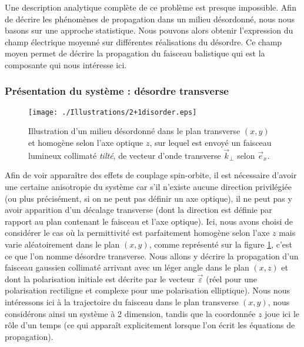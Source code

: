 \documentclass[a4paper,11pt]{article} %
\begin{document}
	Une description analytique complète de ce problème est presque impossible. Afin de décrire les phénomènes de propagation dans un milieu désordonné, nous nous basons sur une approche statistique. Nous pouvons alors obtenir l'expression du champ électrique moyenné sur différentes réalisations du désordre. Ce champ moyen permet de décrire la propagation du faisceau balistique qui est la composante qui nous intéresse ici.
	
	
	\subsubsection{Présentation du système : désordre transverse}
	
	\begin{figure}[h]
		\centering
		\begin{minipage}[c]{0.85\linewidth}
			\centering
			\texttt{[image: ./Illustrations/2+1disorder.eps]}
			\caption{Illustration d'un milieu désordonné dans le plan transverse $ (x,y) $ et homogène selon l'axe optique $ z $, sur lequel est envoyé un faisceau lumineux collimaté \textit{tilté}, de vecteur d'onde transverse $ \vec{k}_\perp $ selon $ \vec{e}_x $.}
			\label{fig:systeme_desordre_transverse}
		\end{minipage}
	\end{figure}

	Afin de voir apparaître des effets de couplage spin-orbite, il est nécessaire d'avoir une certaine anisotropie du système car s'il n'existe aucune direction privilégiée (ou plus précisément, si on ne peut pas définir un axe optique), il ne peut pas y avoir apparition d'un décalage transverse (dont la direction est définie par rapport au plan contenant le faisceau et l'axe optique). Ici, nous avons choisi de considérer le cas où la permittivité est parfaitement homogène selon l'axe $ z $ mais varie aléatoirement dans le plan $ (x,y) $, comme représenté sur la figure \ref{fig:systeme_desordre_transverse}, c'est ce que l'on nomme désordre transverse. Nous allons y décrire la propagation d'un faisceau gaussien collimaté arrivant avec un léger angle dans le plan $ (x,z) $ et dont la polarisation initiale est décrite par le vecteur $ \vec{\varepsilon} $ (réel pour une polarisation rectiligne et complexe pour une polarisation elliptique). Nous nous intéressons ici à la trajectoire du faisceau dans le plan transverse $ (x,y) $, nous considérons ainsi un système à 2 dimension, tandis que la coordonnée $ z $ joue ici le rôle d'un temps (ce qui apparaît explicitement lorsque l'on écrit les équations de propagation).\\
	
\end{document}
